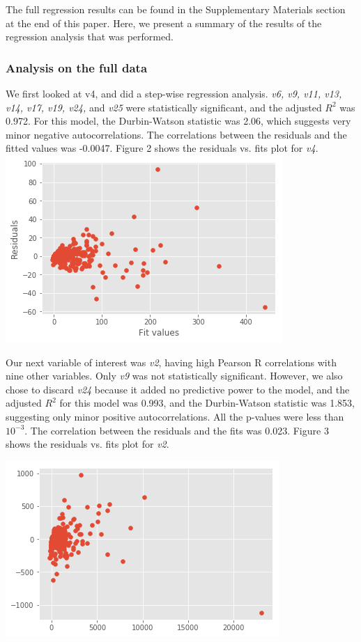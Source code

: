 \documentclass[12pt,a4paper,twocolumn]{article}
\begin{document}
The full regression results can be found in the Supplementary Materials section at the end of this paper. Here, we present a summary of the results of the regression analysis that was performed.

\subsubsection{Analysis on the full data}
We first looked at v4, and did a step-wise regression analysis. \textit{v6, v9, v11, v13, v14, v17, v19, v24,} and \textit{v25} were statistically significant, and the adjusted $R^2$ was 0.972. For this model, the Durbin-Watson statistic was 2.06, which suggests very minor negative autocorrelations. The correlations between the residuals and the fitted values was -0.0047. Figure 2 shows the residuals vs. fits plot for \textit{v4}.\\

\includegraphics[scale=0.5]{fig2.png}
\begingroup
{}
\endgroup
\hfill\break

Our next variable of interest was \textit{v2}, having high Pearson R correlations with nine other variables. Only \textit{v9} was not statistically significant. However, we also chose to discard \textit{v24} because it added no predictive power to the model, and the adjusted $R^2$ for this model was 0.993, and the Durbin-Watson statistic was 1.853, suggesting only minor positive autocorrelations. All the p-values were less than $10^{-3}$. The correlation between the residuals and the fits was 0.023. Figure 3 shows the residuals vs. fits plot for \textit{v2}.

\includegraphics[scale=0.5]{fig3.png}
\begingroup
{}
\endgroup
\hfill\break
\end{document}
